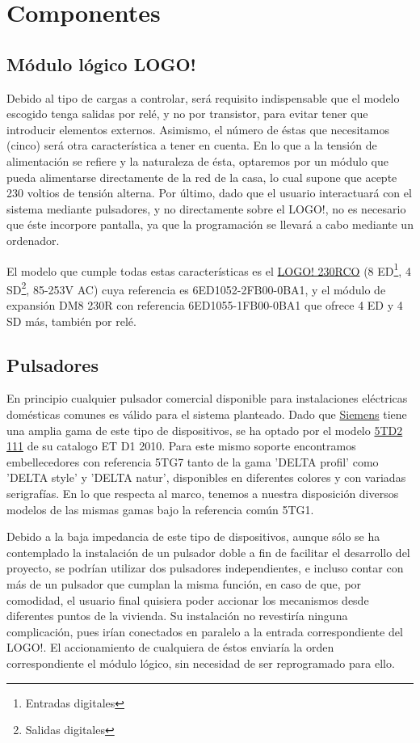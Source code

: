 \section{Componentes}

\subsection{M\'odulo l\'ogico LOGO!}

Debido al tipo de cargas a controlar, ser\'a requisito indispensable que el modelo escogido tenga salidas por rel\'e, y no por transistor, para evitar tener que introducir elementos externos. Asimismo, el n\'umero de \'estas que necesitamos (cinco) ser\'a otra caracter\'istica a tener en cuenta. En lo que a la tensi\'on de alimentaci\'on se refiere y la naturaleza de \'esta, optaremos por un m\'odulo que pueda alimentarse directamente de la red de la casa, lo cual supone que acepte 230 voltios de tensi\'on alterna. Por \'ultimo, dado que el usuario interactuar\'a con el sistema mediante pulsadores, y no directamente sobre el LOGO!, no es necesario que \'este incorpore pantalla, ya que la programaci\'on se llevar\'a a cabo mediante un ordenador.

El modelo que cumple todas estas caracter\'isticas es el \hyperref[LOGO]{LOGO! 230RCO} (8 ED\footnote{\tiny{Entradas digitales}}, 4 SD\footnote{\tiny{Salidas digitales}}, 85-253V AC) cuya referencia es 6ED1052-2FB00-0BA1, y el m\'odulo de expansi\'on DM8 230R con referencia 6ED1055-1FB00-0BA1 que ofrece 4 ED y 4 SD m\'as, tambi\'en por rel\'e.

\subsection{Pulsadores}

En principio cualquier pulsador comercial disponible para instalaciones el\'ectricas dom\'esticas comunes es v\'alido para el sistema planteado. Dado que \hyperref[Siemens]{Siemens} tiene una amplia gama de este tipo de dispositivos, se ha optado por el modelo \hyperref[Pulsadores]{5TD2 111} de su catalogo ET D1 2010. Para este mismo soporte encontramos embellecedores con referencia 5TG7 tanto de la gama 'DELTA profil' como 'DELTA style' y 'DELTA natur', disponibles en diferentes colores y con variadas serigraf\'ias. En lo que respecta al marco, tenemos a nuestra disposici\'on diversos modelos de las mismas gamas bajo la referencia com\'un 5TG1.

Debido a la baja impedancia de este tipo de dispositivos, aunque s\'olo se ha contemplado la instalaci\'on de un pulsador doble a fin de facilitar el desarrollo del proyecto, se podr\'ian utilizar dos pulsadores independientes, e incluso contar con m\'as de un pulsador que cumplan la misma funci\'on, en caso de que, por comodidad, el usuario final quisiera poder accionar los mecanismos desde diferentes puntos de la vivienda. Su instalaci\'on no revestir\'ia ninguna complicaci\'on, pues ir\'ian conectados en paralelo a la entrada correspondiente del LOGO!. El accionamiento de cualquiera de \'estos enviar\'ia la orden correspondiente el m\'odulo l\'ogico, sin necesidad de ser reprogramado para ello.

